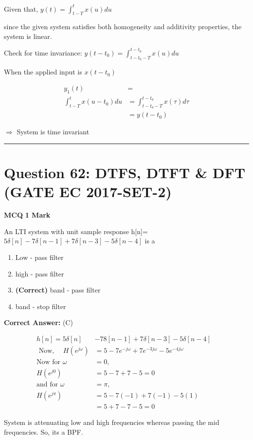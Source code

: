 \documentclass[11pt,a4paper]{article}
\begin{document}
\begin{tcolorbox}[solbox, title=Detailed Solution -- Question 61]
Given that,  $y(t)=\int_{t-T}^{t} x(u) d u$

since the given system satisfies both
homogeneity and additivity properties, the
system is linear.

Check for time invariance:
$y\left(t-t_{0}\right)=\int_{t-t_{0}-T}^{t-t_{0}} x(u) d u$

When the applied input is  $x\left(t-t_{0}\right)$

\[
\begin{aligned}
y_{1}(t) &=\\
\int_{t-T}^{t} x\left(u-t_{0}\right) d u &=\int_{t-t_{0}-T}^{t-t_{0}} x(\tau) d \tau \\
&=y\left(t-t_{0}\right)
\end{aligned}
\]

$\Rightarrow$ System is time invariant
\end{tcolorbox}

\vspace{1.5em}
\hrule
\vspace{1.5em}

\section*{Question 62: DTFS, DTFT \& DFT (GATE EC 2017-SET-2)}
\noindent \textbf{\color{primary}MCQ} \hfill \textbf{\color{secondary}1 Mark}


\noindent An LTI system with unit sample response h[n]=$5\delta [n]-7\delta [n-1]+7\delta [n-3]-5\delta [n-4]$ is a


\begin{enumerate}[label=(\Alph*)]
    \item Low - pass filter
    \item high - pass filter
    \item \textbf{(Correct)} band - pass filter
    \item band - stop filter
\end{enumerate}

\noindent \textbf{Correct Answer:} (C)

\begin{tcolorbox}[solbox, title=Detailed Solution -- Question 62]
\[
\begin{aligned} h[n]=5 \delta[n]&-78[n-1]+7 \delta[n-3]-5 \delta[n-4] & \\ \text { Now, } \quad H\left(e^{j \omega}\right)&=5-7 e^{-j \omega}+7 e^{-3 j \omega}-5 e^{-4 j \omega}\\ \text{Now for }\omega & =0, \\ H\left(e^{j 0}\right)&=5-7+7-5=0\\ \text{and for }\omega & =\pi, &\\ H\left(e^{j \pi}\right) &=5-7(-1)+7(-1)-5(1) \\ &=5+7-7-5=0 \end{aligned}
\]

 System is attenuating low and high frequencies whereas passing the mid frequencies. So, its a BPF.
\end{tcolorbox}
\end{document}

